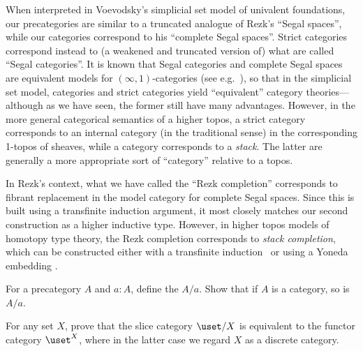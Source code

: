 When interpreted in Voevodsky's simplicial set model of univalent foundations, our precategories are similar to a truncated analogue of Rezk's ``Segal spaces'', while our categories correspond to his ``complete Segal spaces''.
%
Strict categories correspond instead to (a weakened and truncated version of) what are called ``Segal categories''.
It is known that Segal categories and complete Segal spaces are equivalent models for $(\infty,1)$-categories (see e.g.~\cite{bergner:infty-one}), so that in the simplicial set model, categories and strict categories yield ``equivalent'' category theories---although as we have seen, the former still have many advantages.
However, in the more general categorical semantics of a higher topos,
%
a strict category corresponds to an internal category (in the traditional sense) in the corresponding 1-topos of sheaves, while a category corresponds to a \emph{stack}.
%
The latter are generally a more appropriate sort of ``category'' relative to a topos.

In Rezk's context, what we have called the ``Rezk completion'' corresponds to fibrant replacement
in the model category for complete Segal spaces.
Since this is built using a transfinite induction argument, it most closely matches our second construction as a higher inductive type.
However, in higher topos models of homotopy type theory, the Rezk completion corresponds to \emph{stack completion}, which can be constructed either with a transfinite induction~\cite{jt:strong-stacks} or using a Yoneda embedding \cite{bunge:stacks-morita-internal}.


\sectionExercises

\begin{ex}\label{ex:slice-precategory}
  For a precategory $A$ and $a:A$, define the  $A/a$.
  Show that if $A$ is a category, so is $A/a$.
\end{ex}

\begin{ex}\label{ex:set-slice-over-equiv-functor-category}
  For any set $X$, prove that the slice category $\uset/X$ is equivalent to the functor category $\uset^X$, where in the latter case we regard $X$ as a discrete category.
\end{ex}

